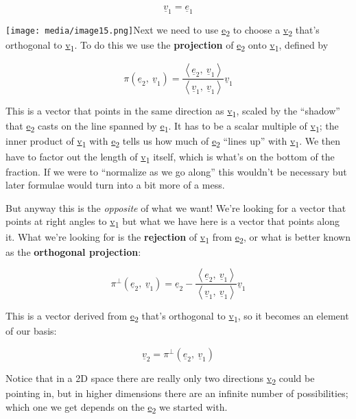 \documentclass[oneside,english]{amsbook}
\numberwithin{section}{chapter}
\theoremstyle{plain}
\theoremstyle{definition}
\begin{document}
\[{\underline{v}}_{1} = {\underline{e}}_{1}\]

\texttt{[image: media/image15.png]}Next
we need to use \ul{e}\textsubscript{2} to choose a
\ul{v}\textsubscript{2} that's orthogonal to \ul{v}\textsubscript{1}. To
do this we use the \textbf{projection} of \ul{e}\textsubscript{2} onto
\ul{v}\textsubscript{1}, defined by

\[\pi({\underline{e}}_{2},\ {\underline{v}}_{1}) = \frac{\left\langle {\underline{e}}_{2},\ {\underline{v}}_{1} \right\rangle}{\left\langle {\underline{v}}_{1},\ {\underline{v}}_{1} \right\rangle}{\underline{v}}_{1}\]

This is a vector that points in the same direction as
\ul{v}\textsubscript{1}, scaled by the ``shadow'' that
\ul{e}\textsubscript{2} casts on the line spanned by
\ul{e}\textsubscript{1}. It has to be a scalar multiple of
\ul{v}\textsubscript{1}; the inner product of \ul{v}\textsubscript{1}
with \ul{e}\textsubscript{2} tells us how much of
\ul{e}\textsubscript{2} ``lines up'' with \ul{v}\textsubscript{1}. We
then have to factor out the length of \ul{v}\textsubscript{1} itself,
which is what's on the bottom of the fraction. If we were to ``normalize
as we go along'' this wouldn't be necessary but later formulae would
turn into a bit more of a mess.

But anyway this is the \emph{opposite} of what we want! We're looking
for a vector that points at right angles to \ul{v}\textsubscript{1} but
what we have here is a vector that points along it. What we're looking
for is the \textbf{rejection} of \ul{v}\textsubscript{1} from
\ul{e}\textsubscript{2}, or what is better known as the
\textbf{orthogonal projection}:

\[\pi^{\bot}({\underline{e}}_{2},\ {\underline{v}}_{1}) = {\underline{e}}_{2} - \frac{\left\langle {\underline{e}}_{2},\ {\underline{v}}_{1} \right\rangle}{\left\langle {\underline{v}}_{1},\ {\underline{v}}_{1} \right\rangle}{\underline{v}}_{1}\]

This is a vector derived from \ul{e}\textsubscript{2} that's orthogonal
to \ul{v}\textsubscript{1}, so it becomes an element of our basis:

\[{\underline{v}}_{2} = \pi^{\bot}({\underline{e}}_{2},\ {\underline{v}}_{1})\]

Notice that in a 2D space there are really only two directions
\ul{v}\textsubscript{2} could be pointing in, but in higher dimensions
there are an infinite number of possibilities; which one we get depends
on the \ul{e}\textsubscript{2} we started with.
\end{document}
